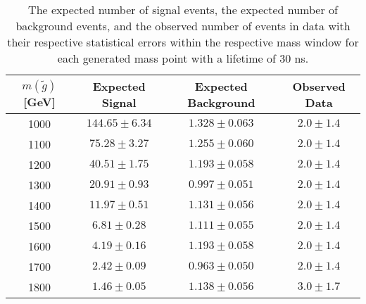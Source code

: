 \begin{table}[!htbp]
  \begin{center}
    \begin{tabular}{cccc}
      \hline
      $m(\tilde{g})$ [GeV]  & Expected Signal & Expected Background & Observed Data\\ 
      \hline
      1000    & $144.65 \pm 6.34 $ & $1.328 \pm 0.063 $ & $2.0 \pm 1.4$ \\
      1100    & $75.28 \pm 3.27 $  & $1.255 \pm 0.060 $ & $2.0 \pm 1.4$ \\
      1200    & $40.51 \pm 1.75 $  & $1.193 \pm 0.058 $ & $2.0 \pm 1.4$ \\
      1300    & $20.91 \pm 0.93 $  & $0.997 \pm 0.051 $ & $2.0 \pm 1.4$ \\
      1400    & $11.97 \pm 0.51 $  & $1.131 \pm 0.056 $ & $2.0 \pm 1.4$ \\
      1500    & $6.81 \pm 0.28 $   & $1.111 \pm 0.055 $ & $2.0 \pm 1.4$ \\
      1600    & $4.19 \pm 0.16 $   & $1.193 \pm 0.058 $ & $2.0 \pm 1.4$ \\
      1700    & $2.42 \pm 0.09 $   & $0.963 \pm 0.050 $ & $2.0 \pm 1.4$ \\
      1800    & $1.46 \pm 0.05 $   & $1.138 \pm 0.056 $ & $3.0 \pm 1.7$ \\
      \hline
    \end{tabular}
  \end{center}
  \caption{The expected number of signal events, the expected number of background events, and the observed number of events in data with their respective statistical errors within the respective mass window for each generated mass point with a lifetime of 30 ns.}
  \label{tab:app_counts_30ns}
\end{table}

